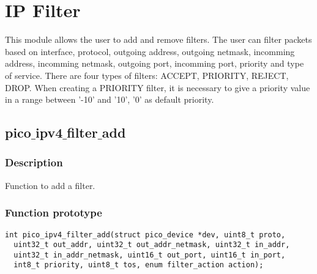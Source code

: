 \section{IP Filter}

This module allows the user to add and remove filters. The user can filter packets based on interface, protocol, outgoing address, outgoing netmask, incomming address, incomming netmask, outgoing port, incomming port, priority and type of service. There are four types of filters: ACCEPT, PRIORITY, REJECT, DROP. When creating a PRIORITY filter, it is necessary to give a priority value in a range between '-10' and '10', '0' as default priority.


\subsection{pico$\_$ipv4$\_$filter$\_$add}

\subsubsection*{Description}
Function to add a filter.

\subsubsection*{Function prototype}
\begin{verbatim}
int pico_ipv4_filter_add(struct pico_device *dev, uint8_t proto,
  uint32_t out_addr, uint32_t out_addr_netmask, uint32_t in_addr,
  uint32_t in_addr_netmask, uint16_t out_port, uint16_t in_port,
  int8_t priority, uint8_t tos, enum filter_action action);
\end{verbatim}


